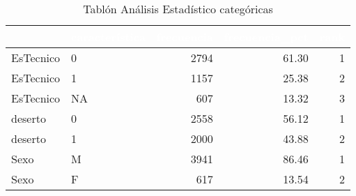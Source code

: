 
\begin{table}[!h]
	
	\caption{\label{tab:tablon_est_cat}Tablón Análisis Estadístico categóricas}
	\centering
		\begin{tabular}[t]{llrrr}
			\toprule
			\rowcolor{black}  \multicolumn{1}{c}{\textcolor{white}{\textbf{variable}}} & \multicolumn{1}{c}{\textcolor{white}{\textbf{característica}}} & \multicolumn{1}{c}{\textcolor{white}{\textbf{frecuencia}}} & \multicolumn{1}{c}{\textcolor{white}{\textbf{frecuencia\_pct}}} & \multicolumn{1}{c}{\textcolor{white}{\textbf{rank}}}\\
			\midrule
			\rowcolor{gray!6}  EsTecnico & 0 & 2794 & 61.30 & 1\\
			EsTecnico & 1 & 1157 & 25.38 & 2\\
			\rowcolor{gray!6}  EsTecnico & NA & 607 & 13.32 & 3\\
			deserto & 0 & 2558 & 56.12 & 1\\
			\rowcolor{gray!6}  deserto & 1 & 2000 & 43.88 & 2\\
			\addlinespace
			Sexo & M & 3941 & 86.46 & 1\\
			\rowcolor{gray!6}  Sexo & F & 617 & 13.54 & 2\\
			\bottomrule
	\end{tabular}%
\end{table}